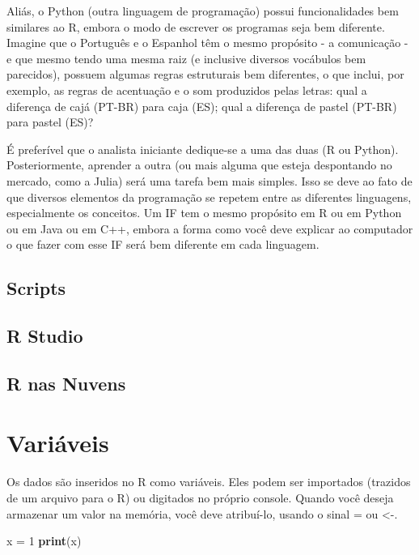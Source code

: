\documentclass[
]{book}
\newenvironment{Shaded}{\begin{snugshade}}{\end{snugshade}}
\newcommand{\DecValTok}[1]{\textcolor[rgb]{0.00,0.00,0.81}{#1}}
\newcommand{\KeywordTok}[1]{\textcolor[rgb]{0.13,0.29,0.53}{\textbf{#1}}}
\newcommand{\NormalTok}[1]{#1}
\newcommand{\StringTok}[1]{\textcolor[rgb]{0.31,0.60,0.02}{#1}}
\begin{document}
Aliás, o Python (outra linguagem de programação) possui funcionalidades bem similares ao R, embora o modo de escrever os programas seja bem diferente. Imagine que o Português e o Espanhol têm o mesmo propósito - a comunicação - e que mesmo tendo uma mesma raiz (e inclusive diversos vocábulos bem parecidos), possuem algumas regras estruturais bem diferentes, o que inclui, por exemplo, as regras de acentuação e o som produzidos pelas letras: qual a diferença de cajá (PT-BR) para caja (ES); qual a diferença de pastel (PT-BR) para pastel (ES)?

É preferível que o analista iniciante dedique-se a uma das duas (R ou Python). Posteriormente, aprender a outra (ou mais alguma que esteja despontando no mercado, como a Julia) será uma tarefa bem mais simples. Isso se deve ao fato de que diversos elementos da programação se repetem entre as diferentes linguagens, especialmente os conceitos. Um IF tem o mesmo propósito em R ou em Python ou em Java ou em C++, embora a forma como você deve explicar ao computador o que fazer com esse IF será bem diferente em cada linguagem.

\hypertarget{scripts}{%
\section{Scripts}\label{scripts}}

\hypertarget{r-studio}{%
\section{R Studio}\label{r-studio}}

\hypertarget{r-nas-nuvens}{%
\section{R nas Nuvens}\label{r-nas-nuvens}}

\hypertarget{variuxe1veis}{%
\chapter{Variáveis}\label{variuxe1veis}}

Os dados são inseridos no R como variáveis. Eles podem ser importados (trazidos de um arquivo para o R) ou digitados no próprio console. Quando você deseja armazenar um valor na memória, você deve atribuí-lo, usando o sinal = ou \textless-.

\begin{Shaded}
\begin{Highlighting}[]
\NormalTok{x =}\StringTok{ }\DecValTok{1}
\KeywordTok{print}\NormalTok{(x)}
\end{Highlighting}
\end{Shaded}
\end{document}
